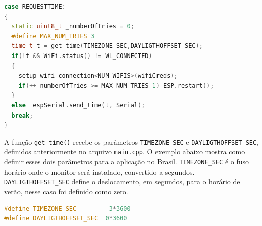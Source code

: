 \begin{lstlisting}[language=C++, caption=Sequencia de operações no comando REQUESTTIME]
case REQUESTTIME:
{
  static uint8_t _numberOfTries = 0;
  #define MAX_NUM_TRIES 3
  time_t t = get_time(TIMEZONE_SEC,DAYLIGTHOFFSET_SEC);
  if(!t && WiFi.status() != WL_CONNECTED)
  {
    setup_wifi_connection<NUM_WIFIS>(wifiCreds);
    if(++_numberOfTries >= MAX_NUM_TRIES-1) ESP.restart();
  }
  else  espSerial.send_time(t, Serial);
  break;
}
\end{lstlisting}
\label{code:esp-wifi-time-sequence}

A função \texttt{get\_time()} recebe os parâmetros \texttt{TIMEZONE\_SEC} e \texttt{DAYLIGTHOFFSET\_SEC}, definidos anteriormente no arquivo \texttt{main.cpp}. O exemplo abaixo mostra como definir esses dois parâmetros para a aplicação no Brasil. \texttt{TIMEZONE\_SEC} é o fuso horário onde o monitor será instalado, convertido a segundos. \texttt{DAYLIGTHOFFSET\_SEC} define o deslocamento, em segundos, para o horário de verão, nesse caso foi definido como zero.

\begin{lstlisting}[language=C++]
#define TIMEZONE_SEC        -3*3600
#define DAYLIGTHOFFSET_SEC  0*3600
\end{lstlisting}